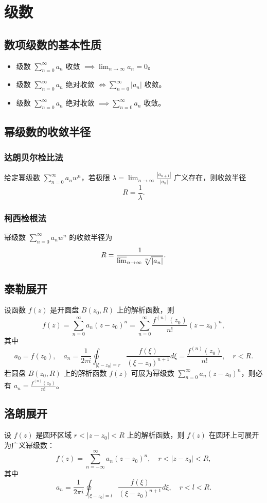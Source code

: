 \chapter{级数}

\section{数项级数的基本性质}
\begin{itemize}[leftmargin=2em]
    \item 级数 \( \sum_{n=0}^{\infty} a_n \) 收敛 \( \implies \lim_{n \to \infty} a_n = 0 \)。
    \item 级数 \( \sum_{n=0}^{\infty} a_n \) 绝对收敛 \( \iff \sum_{n=0}^{\infty} |a_n| \) 收敛。
    \item 级数 \( \sum_{n=0}^{\infty} a_n \) 绝对收敛 \( \implies \sum_{n=0}^{\infty} a_n \) 收敛。
\end{itemize}

\section{幂级数的收敛半径}
\subsection{达朗贝尔检比法}
给定幂级数 \( \sum_{n=0}^{\infty} a_n w^n \)，若极限 \( \lambda = \lim_{n \to \infty} \frac{|a_{n+1}|}{|a_n|} \) 广义存在，则收敛半径
\[
R = \frac{1}{\lambda}.
\]

\subsection{柯西检根法}
幂级数 \( \sum_{n=0}^{\infty} a_n w^n \) 的收敛半径为
\[
R = \frac{1}{\varlimsup_{n \to \infty} \sqrt[n]{|a_n|}}.
\]

\section{泰勒展开}
设函数 \( f(z) \) 是开圆盘 \( B(z_0, R) \) 上的解析函数，则
\[
f(z) = \sum_{n=0}^{\infty} a_n (z - z_0)^n = \sum_{n=0}^{\infty} \frac{f^{(n)}(z_0)}{n!} (z - z_0)^n,
\]
其中
\[
a_0 = f(z_0),\quad a_n = \frac{1}{2\pi i} \oint_{|\xi - z_0|=r} \frac{f(\xi)}{(\xi - z_0)^{n+1}} d\xi = \frac{f^{(n)}(z_0)}{n!},\quad r < R.
\]
若圆盘 \( B(z_0, R) \) 上的解析函数 \( f(z) \) 可展为幂级数 \( \sum_{n=0}^{\infty} a_n (z - z_0)^n \)，则必有 \( a_n = \frac{f^{(n)}(z_0)}{n!} \)。

\section{洛朗展开}
设 \( f(z) \) 是圆环区域 \( r < |z - z_0| < R \) 上的解析函数，则 \( f(z) \) 在圆环上可展开为广义幂级数：
\[
f(z) = \sum_{n=-\infty}^{\infty} a_n (z - z_0)^n, \quad r < |z - z_0| < R,
\]
其中
\[
a_n = \frac{1}{2\pi i} \oint_{|\xi - z_0|=l} \frac{f(\xi)}{(\xi - z_0)^{n+1}} d\xi, \quad r < l < R.
\]